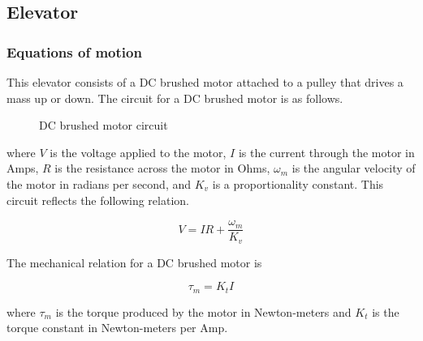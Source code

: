 \subsection{Elevator}

\subsubsection{Equations of motion}

This elevator consists of a DC brushed motor attached to a pulley that drives a
mass up or down. The circuit for a DC brushed motor is as follows.

\begin{figure}[H]
  \centering


  \caption{DC brushed motor circuit}
  \label{fig:dc_motor_circuit}
\end{figure}

where $V$ is the voltage applied to the motor, $I$ is the current through the
motor in Amps, $R$ is the resistance across the motor in Ohms, $\omega_m$ is the
angular velocity of the motor in radians per second, and $K_v$ is a
proportionality constant. This circuit reflects the following relation.

\begin{equation}
  V = IR + \frac{\omega_m}{K_v} \label{eq:elevator_V}
\end{equation}

The mechanical relation for a DC brushed motor is

\begin{equation}
  \tau_m = K_t I \label{eq:elevator_tau_m}
\end{equation}

where $\tau_m$ is the torque produced by the motor in Newton-meters and $K_t$ is
the torque constant in Newton-meters per Amp.

